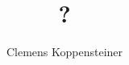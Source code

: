 \documentclass[english]{thesis}
\title{?}
\author{Clemens Koppensteiner}
\begin{document}
\frontmatter

\maketitlepage

\begin{abstract}
\end{abstract}



\tableofcontents

\mainmatter





\backmatter

\printbibliography
\end{document}
